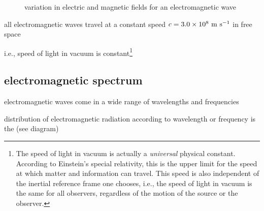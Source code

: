 \begin{figure}[ht]
	\caption{variation in electric and magnetic fields for an electromagnetic wave}
\end{figure}

	
\cmt all electromagnetic waves travel at a constant speed $c=3.0\times10^8\text{ m s$^{-1}$}$ in free space

i.e., speed of light in vacuum is constant\footnote{The speed of light in vacuum is actually a \emph{universal} physical constant. According to Einstein's special relativity, this is the upper limit for the speed at which matter and information can travel. This speed is also independent of the inertial reference frame one chooses, i.e., the speed of light in vacuum is the same for all observers, regardless of the motion of the source or the observer.}



\subsection{electromagnetic spectrum}

electromagnetic waves come in a wide range of wavelengths and frequencies 

distribution of electromagnetic radiation according to wavelength or frequency is the  (see diagram)



